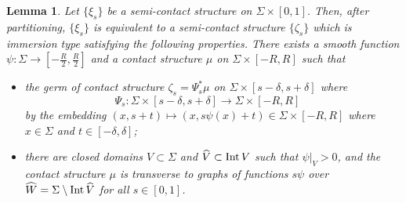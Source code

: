 \documentclass[12pt]{paper}
\theoremstyle{plain}
\newtheorem{lemma}[theorem]{Lemma}
\theoremstyle{definition}
\newcommand{\wh}{\widehat}
\newcommand{\Int}{{\rm Int\,}} %
\numberwithin{figure}{section}
\begin{document}
\begin{lemma}\label{lm:Reeb-trick}
Let $\{\xi_s\}$ be a semi-contact structure on $\Sigma\times[0,1]$. Then, after partitioning, $\{\xi_s\}$ is equivalent to a semi-contact structure $\{\zeta_s\}$ which is immersion type satisfying the following properties. There exists a smooth
  function $\psi:\Sigma\to [-\frac R2,\frac R2]$ and a contact structure $\mu$ on $\Sigma\times[-R,R]$ such that
  \begin{itemize}
  \item the germ of contact structure $\zeta_s = \Psi_s^*\mu$ on $\Sigma\times[s-\delta, s+\delta]$ where
  $$
  \Psi_s: \Sigma\times[s-\delta, s+\delta] \to \Sigma\times[-R,R] \quad
  $$ by the embedding $(x,s+t)\mapsto (x, s\psi(x)+t)\in\Sigma\times[-R,R]$ where $x\in\Sigma$ and $t\in[-\delta,\delta]$;
  \item  
 there  are closed domains $V\subset\Sigma$ and $\wh V\subset \Int V$ such that $\psi|_V >0$,  and the contact structure $\mu$ is   transverse to   graphs of functions $s\psi $ over $\wh W=\Sigma\setminus\Int\wh V$ for all $s\in[0,1]$.
  \end{itemize} 
\end{lemma}
\end{document}
